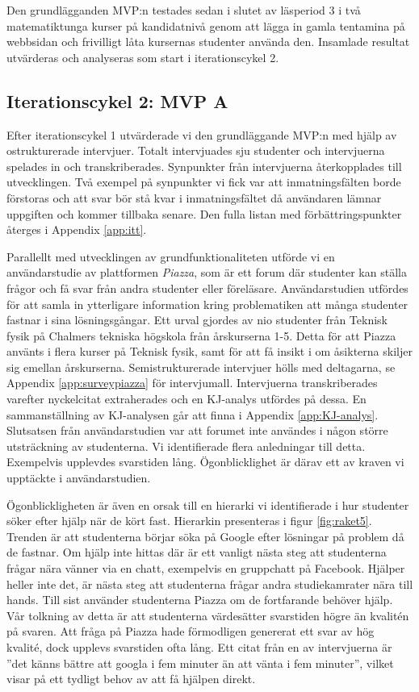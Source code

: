 Den grundlägganden MVP:n testades sedan i slutet av läsperiod 3 i två matematiktunga kurser på kandidatnivå genom att lägga in gamla tentamina på webbsidan och frivilligt låta kursernas studenter använda den. Insamlade resultat utvärderas och analyseras som start i iterationscykel 2.

\subsection{Iterationscykel 2: MVP A}
Efter iterationscykel 1 utvärderade vi den grundläggande MVP:n med hjälp av ostrukturerade intervjuer. Totalt intervjuades sju studenter och intervjuerna spelades in och transkriberades. Synpunkter från intervjuerna återkopplades till utvecklingen. Två exempel på synpunkter vi fick var att inmatningsfälten borde förstoras och att svar bör stå kvar i inmatningsfältet då användaren lämnar uppgiften och kommer tillbaka senare. Den fulla listan med förbättringspunkter återges i Appendix \ref{app:itt}. 

Parallellt med utvecklingen av grundfunktionaliteten utförde vi en användarstudie av plattformen \emph{Piazza}, som är ett forum där studenter kan ställa frågor och få svar från andra studenter eller föreläsare. Användarstudien utfördes för att samla in ytterligare information kring problematiken att många studenter fastnar i sina lösningsgångar. Ett urval gjordes av nio studenter från Teknisk fysik på Chalmers tekniska högskola från årskurserna 1-5. Detta för att Piazza använts i flera kurser på Teknisk fysik, samt för att få insikt i om åsikterna skiljer sig emellan årskurserna. Semistrukturerade intervjuer hölls med deltagarna, se Appendix \ref{app:surveypiazza} för intervjumall. Intervjuerna transkriberades varefter nyckelcitat extraherades och en KJ-analys utfördes på dessa. En sammanställning av KJ-analysen går att finna i Appendix \ref{app:KJ-analys}. Slutsatsen från användarstudien var att forumet inte användes i någon större utsträckning av studenterna. Vi identifierade flera anledningar till detta. Exempelvis upplevdes svarstiden lång. Ögonblicklighet är därav ett av kraven vi upptäckte i användarstudien.

Ögonblickligheten är även en orsak till en hierarki vi identifierade i hur studenter söker efter hjälp när de kört fast. Hierarkin presenteras i figur \ref{fig:raket5}. Trenden är att studenterna börjar söka på Google efter lösningar på problem då de fastnar. Om hjälp inte hittas där är ett vanligt nästa steg att studenterna frågar nära vänner via en chatt, exempelvis en gruppchatt på Facebook. Hjälper heller inte det, är nästa steg att studenterna frågar andra studiekamrater nära till hands. Till sist använder studenterna Piazza om de fortfarande behöver hjälp. Vår tolkning av detta är att studenterna värdesätter svarstiden högre än kvalitén på svaren. Att fråga på Piazza hade förmodligen genererat ett svar av hög kvalité, dock upplevs svarstiden ofta lång. Ett citat från en av intervjuerna är ''det känns bättre att googla i fem minuter än att vänta i fem minuter'', vilket visar på ett tydligt behov av att få hjälpen direkt.

